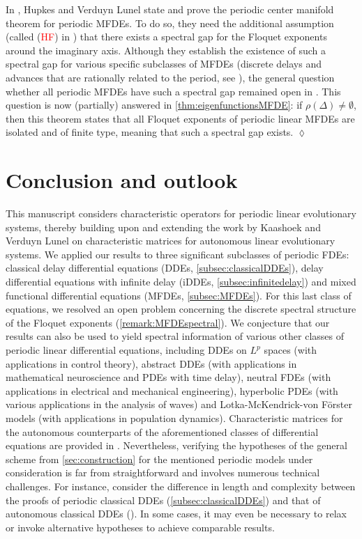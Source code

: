 \documentclass[english]{myarticle}
\begin{document}
\begin{sloppypar}
\begin{remark} \label{remark:MFDEspectral}
In \cite{Hupkes2008}, Hupkes and Verduyn Lunel state and prove the periodic center manifold theorem for periodic MFDEs. To do so, they need the additional assumption (called (\textcolor{red}{HF}) in \cite{Hupkes2008}) that there exists a spectral gap for the Floquet exponents around the imaginary axis. Although they establish the existence of such a spectral gap for various specific subclasses of MFDEs (discrete delays and advances that are rationally related to the period, see \cite[Lemma 3.3 and Corollary 3.4-3.5]{Hupkes2008}), the general question whether all periodic MFDEs have such a spectral gap remained open in \cite{Hupkes2008}. This question is now (partially) answered in \cref{thm:eigenfunctionsMFDE}: if $\rho(\Delta) \neq \emptyset$, then this theorem states that all Floquet exponents of periodic linear MFDEs are isolated and of finite type, meaning that such a spectral gap exists. 
\hfill $\lozenge$
\end{remark}

\section{Conclusion and outlook} \label{sec:conclusion}
This manuscript considers characteristic operators for periodic linear evolutionary systems, thereby building upon and extending the work by Kaashoek and Verduyn Lunel \cite{Kaashoek1992} on characteristic matrices for autonomous linear evolutionary systems.
We applied our results to three significant subclasses of periodic FDEs: classical delay differential equations (DDEs, \cref{subsec:classicalDDEs}), delay differential equations with infinite delay (iDDEs, \cref{subsec:infinitedelay}) and mixed functional differential equations (MFDEs, \cref{subsec:MFDEs}). For this last class of equations, we resolved an open problem concerning the discrete spectral structure of the Floquet exponents (\cref{remark:MFDEspectral}). We conjecture that our results can also be used to yield spectral information of various other classes of periodic linear differential equations, including DDEs on $L^p$ spaces (with applications in control theory), abstract DDEs (with applications in mathematical neuroscience and PDEs with time delay), neutral FDEs (with applications in electrical and mechanical engineering), hyperbolic PDEs (with various applications in the analysis of waves) and Lotka-McKendrick-von Förster models (with applications in population dynamics). Characteristic matrices for the autonomous counterparts of the aforementioned classes of differential equations are provided in \cite[Section II]{Kaashoek1992}. Nevertheless, verifying the hypotheses of the general scheme from \cref{sec:construction} for the mentioned periodic models under consideration is far from straightforward and involves numerous technical challenges. For instance, consider the difference in length and complexity between the proofs of periodic classical DDEs (\cref{subsec:classicalDDEs}) and that of autonomous classical DDEs (\cite[Section II.1]{Kaashoek1992}). In some cases, it may even be necessary to relax or invoke alternative hypotheses to achieve comparable results.


\end{sloppypar}
\end{document}
